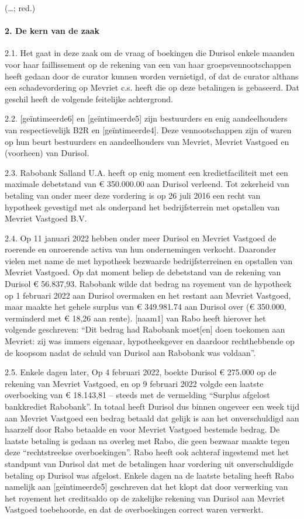 \documentclass[
  dutch,
  a4paper,
]{article}
\begin{document}
(\ldots; red.)

\paragraph{2. De kern van de zaak}\label{de-kern-van-de-zaak}

2.1. Het gaat in deze zaak om de vraag of boekingen die Durisol enkele maanden voor haar faillissement op de rekening van een van haar groepsvennootschappen heeft gedaan door de curator kunnen worden vernietigd, of dat de curator althans een schadevordering op Mevriet c.s. heeft die op deze betalingen is gebaseerd. Dat geschil heeft de volgende feitelijke achtergrond.

2.2. {[}geïntimeerde6{]} en {[}geïntimeerde5{]} zijn bestuurders en enig aandeelhouders van respectievelijk B2R en {[}geïntimeerde4{]}. Deze vennootschappen zijn of waren op hun beurt bestuurders en aandeelhouders van Mevriet, Mevriet Vastgoed en (voorheen) van Durisol.

2.3. Rabobank Salland U.A. heeft op enig moment een kredietfaciliteit met een maximale debetstand van € 350.000.00 aan Durisol verleend. Tot zekerheid van betaling van onder meer deze vordering is op 26 juli 2016 een recht van hypotheek gevestigd met als onderpand het bedrijfsterrein met opstallen van Mevriet Vastgoed B.V.

2.4. Op 11 januari 2022 hebben onder meer Durisol en Mevriet Vastgoed de roerende en onroerende activa van hun ondernemingen verkocht. Daaronder vielen met name de met hypotheek bezwaarde bedrijfsterreinen en opstallen van Mevriet Vastgoed. Op dat moment beliep de debetstand van de rekening van Durisol € 56.837,93. Rabobank wilde dat bedrag na royement van de hypotheek op 1 februari 2022 aan Durisol overmaken en het restant aan Mevriet Vastgoed, maar maakte het gehele surplus van € 349.981.74 aan Durisol over (€ 350.000, verminderd met € 18,26 aan rente). {[}naam1{]} van Rabo heeft hierover het volgende geschreven: ``Dit bedrag had Rabobank moet{[}en{]} doen toekomen aan Mevriet: zij was immers eigenaar, hypotheekgever en daardoor rechthebbende op de koopsom nadat de schuld van Durisol aan Rabobank was voldaan''.

2.5. Enkele dagen later, Op 4 februari 2022, boekte Durisol € 275.000 op de rekening van Mevriet Vastgoed, en op 9 februari 2022 volgde een laatste overboeking van € 18.143,81 -- steeds met de vermelding ``Surplus afgelost bankkrediet Rabobank''. In totaal heeft Durisol dus binnen ongeveer een week tijd aan Mevriet Vastgoed een bedrag betaald dat gelijk is aan het onverschuldigd aan haarzelf door Rabo betaalde en voor Mevriet Vastgoed bestemde bedrag. De laatste betaling is gedaan na overleg met Rabo, die geen bezwaar maakte tegen deze ``rechtstreekse overboekingen''. Rabo heeft ook achteraf ingestemd met het standpunt van Durisol dat met de betalingen haar vordering uit onverschuldigde betaling op Durisol was afgelost. Enkele dagen na de laatste betaling heeft Rabo namelijk aan {[}geïntimeerde5{]} geschreven dat het klopt dat door verwerking van het royement het creditsaldo op de zakelijke rekening van Durisol aan Mevriet Vastgoed toebehoorde, en dat de overboekingen correct waren verwerkt.
\end{document}
